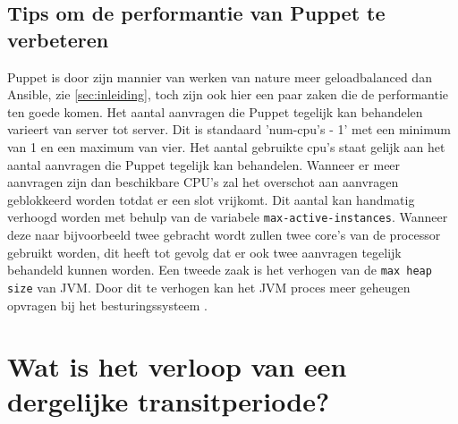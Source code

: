  \subsection{Tips om de performantie van Puppet te verbeteren}
 Puppet is door zijn mannier van werken van nature meer geloadbalanced dan Ansible, zie \ref{sec:inleiding}, toch zijn ook hier een paar zaken die de performantie ten goede komen. Het aantal aanvragen die Puppet tegelijk kan behandelen varieert van server tot server. Dit is standaard 'num-cpu's - 1' met een minimum van 1 en een maximum van vier. Het aantal gebruikte cpu's staat gelijk aan het aantal aanvragen die Puppet tegelijk kan behandelen. Wanneer er meer aanvragen zijn dan beschikbare CPU's zal het overschot aan aanvragen geblokkeerd worden totdat er een slot vrijkomt. Dit aantal kan handmatig verhoogd worden met behulp van de variabele \texttt{max-active-instances}. Wanneer deze naar bijvoorbeeld twee gebracht wordt zullen twee core's van de processor gebruikt worden, dit heeft tot gevolg dat er ook twee aanvragen tegelijk behandeld kunnen worden. \newline
 Een tweede zaak is het verhogen van de \texttt{max heap size} van JVM. Door dit te verhogen kan het JVM proces meer geheugen opvragen bij het besturingssysteem \autocite{PuppetTuning}.
 
 
\section{Wat is het verloop van een dergelijke transitperiode?}
\label{sec:methodologie-verloop-transit}



